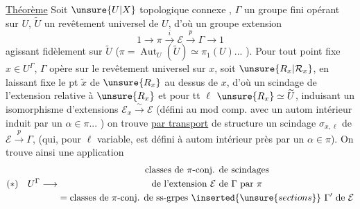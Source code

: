 \uline{Théorème} Soit $\unsure{U|X}$   topologique connexe , $\Gamma$ un groupe fini opérant  sur $U$, $\widetilde U$ un revêtement universel de $U$, d'où  un groupe extension
\[
1\longrightarrow\pi\xrightarrow{i}\mathcal E\xrightarrow{p}\Gamma\longrightarrow1
\]
agissant fidèlement sur $\widetilde U$ ($\pi=\operatorname{Aut}_U(\widetilde U)\simeq\pi_1(U)$... ).
Pour tout point fixe $x\in U^\Gamma$, $\Gamma$ opère sur le revêtement universel  sur $x$, soit  $\unsure{R_x|\mathcal R_x}$, en laissant fixe le pt  $\widetilde x$ de $\unsure{R_x}$ au dessus de $x$, d'où un scindage de l'extension relative à $\unsure{R_x}$
et pour tt   $\ell$  $\unsure{R_x}\simeq\widetilde U$, induisant un isomorphisme d'extensions $\mathcal E_x\xrightarrow{\sim}\mathcal E$ (défini au mod comp. avec un autom intérieur induit par un $\alpha\in\pi$... ) on trouve \uline{par transport} de structure un scindage $\sigma_{x,\ell}$ de $\mathcal E\xrightarrow{p}\Gamma$, (qui, pour $\ell$ variable, est défini à autom intérieur près par un $\alpha\in\pi$).
On trouve ainsi une application
\[
(*)\quad U^\Gamma\longrightarrow
\begin{gathered}
\text{classes de }\pi\text{-conj. de scindages}\\
\text{de l'extension }\mathcal E\text{ de }\Gamma\text{ par }\pi\\
=\text{classes de }\pi\text{-conj. de ss-grpes }\inserted{\unsure{sections}}\ \Gamma'\text{ de }\mathcal E
\end{gathered}
\]
